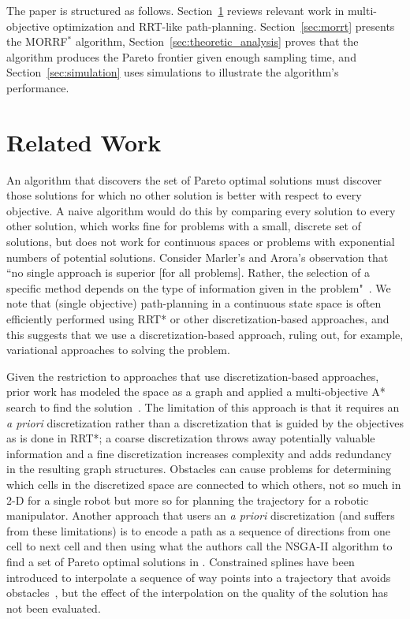 \documentclass{article}
\begin{document}
The paper is structured as follows.  
Section~\ref{sec:related_works} reviews relevant work in multi-objective optimization and RRT-like path-planning. 
Section~\ref{sec:morrt} presents the MORRF$^{*}$ algorithm,  
Section~\ref{sec:theoretic_analysis} proves that the algorithm produces the Pareto frontier given enough sampling time, 
and Section~\ref{sec:simulation} uses simulations to illustrate the algorithm's performance.

\section{Related Work}
\label{sec:related_works}

An algorithm that discovers the set of Pareto optimal solutions must discover those solutions for which no other solution is better with respect to every objective.  A naive algorithm would do this by comparing every solution to every other solution, which works fine for problems with a small, discrete set of solutions, but does not work for continuous spaces or problems with exponential numbers of potential solutions.  
Consider Marler's and Arora's observation that ``no single approach is superior [for all problems].  
Rather, the selection of a specific method depends on the type of information given in the problem"~\cite{marler2004survey}.  
We note that (single objective) path-planning in a continuous state space is often efficiently performed using RRT* or other discretization-based approaches, and this suggests that we use a discretization-based approach, ruling out, for example, variational approaches to solving the problem.    

Given the restriction to approaches that use discretization-based approaches, prior work has modeled the space as a graph and applied a multi-objective A* search to find the solution~\cite{Mandow:2005:NAM:1642293.1642328}. 
The limitation of this approach is that it requires an {\em a priori} discretization rather than a discretization that is guided by the objectives as is done in RRT*; a coarse discretization throws away potentially valuable information and a fine discretization increases complexity and adds redundancy in the resulting graph structures.
Obstacles can cause problems for determining which cells in the discretized space are connected to which others, not so much in 2-D for a single robot but more so for planning the trajectory for a robotic manipulator.
Another approach that users an {\em a priori} discretization (and suffers from these limitations) is to encode a path as a sequence of directions from one cell to next cell and then using what the authors call the NSGA-II algorithm to find a set of Pareto optimal solutions in \cite{Ahmed2013}.  
Constrained splines have been introduced to interpolate a sequence of way points into a trajectory that avoids obstacles~\cite{6181426}, but the effect of the interpolation on the quality of the solution has not been evaluated.
\end{document}
